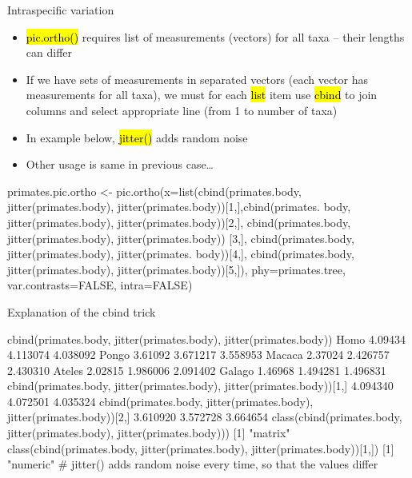 \documentclass[compress, ucs, xelatex, 11pt, xcolor=svgnames,
  hyperref={
    bookmarks=true,
    unicode=true,
    colorlinks=true,
    pdftitle={Molecular data in R},
    plainpages=false,
    pdfauthor={Vojtech Zeisek},
    pdfsubject={Course about phylogeny and evolution in R},
    pdfcreator={XeLaTeX},
    pdfkeywords={R, evolution, phylogeny, molecular data},
    linkcolor=Tomato,
    anchorcolor=SaddleBrown,
    citecolor=Goldenrod,
    filecolor=DarkMagenta,
    menucolor=Sienna,
    urlcolor=DarkTurquoise,
    pdftex},
  url={hyphens, lowtilde} %
  ]{beamer}
\renewcommand{\texttt}[1]{\hl{\ttfamily #1}}
\begin{document}
\begin{frame}[fragile]{Intraspecific variation}
  \begin{itemize}
    \item \texttt{pic.ortho()} requires list of measurements (vectors) for all taxa -- their lengths can differ
    \item If we have sets of measurements in separated vectors (each vector has measurements for all taxa), we must for each \texttt{list} item use \texttt{cbind} to join columns and select appropriate line (from 1 to number of taxa)
    \item In example below, \texttt{jitter()} adds random noise
    \item Other usage is same in previous case\ldots
  \end{itemize}
  \begin{spluscode}
    primates.pic.ortho <- pic.ortho(x=list(cbind(primates.body,
      jitter(primates.body), jitter(primates.body))[1,],cbind(primates.
      body, jitter(primates.body), jitter(primates.body))[2,],
      cbind(primates.body, jitter(primates.body), jitter(primates.body))
      [3,], cbind(primates.body, jitter(primates.body), jitter(primates.
      body))[4,], cbind(primates.body, jitter(primates.body), 
      jitter(primates.body))[5,]), phy=primates.tree, var.contrasts=FALSE,
      intra=FALSE)
  \end{spluscode}
\end{frame}

\begin{frame}[fragile]{Explanation of the cbind trick}
  \begin{spluscode}
    cbind(primates.body, jitter(primates.body), jitter(primates.body))
    Homo         4.09434 4.113074 4.038092
    Pongo        3.61092 3.671217 3.558953
    Macaca       2.37024 2.426757 2.430310
    Ateles       2.02815 1.986006 2.091402
    Galago       1.46968 1.494281 1.496831
    cbind(primates.body, jitter(primates.body), jitter(primates.body))[1,]
      4.094340      4.072501      4.035324 
    cbind(primates.body, jitter(primates.body), jitter(primates.body))[2,]
      3.610920      3.572728      3.664654 
    class(cbind(primates.body, jitter(primates.body),
      jitter(primates.body)))
    [1] "matrix"
    class(cbind(primates.body, jitter(primates.body),
      jitter(primates.body))[1,])
    [1] "numeric"
    # jitter() adds random noise every time, so that the values differ
  \end{spluscode}
\end{frame}
\end{document}

